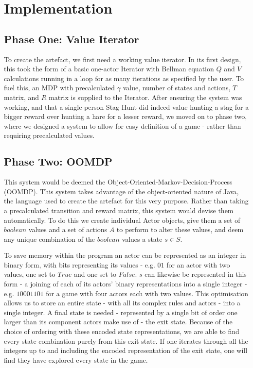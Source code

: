 \chapter{Implementation}\label{C:imp}

\section{Phase One: Value Iterator}

To create the artefact, we first need a working value iterator. In its first design, this took the form of a basic one-actor Iterator with Bellman equation $Q$ and $V$ calculations running in a loop for as many iterations as specified by the user. To fuel this, an MDP with precalculated $\gamma$ value, number of states and actions, $T$ matrix, and $R$ matrix is supplied to the Iterator. After ensuring the system was working, and that a single-person Stag Hunt did indeed value hunting a stag for a bigger reward over hunting a hare for a lesser reward, we moved on to phase two, where we designed a system to allow for easy definition of a game - rather than requiring precalculated values.

\section{Phase Two: OOMDP}

This system would be deemed the Object-Oriented-Markov-Decision-Process (OOMDP). This system takes advantage of the object-oriented nature of Java, the language used to create the artefact for this very purpose. Rather than taking a precalculated transition and reward matrix, this system would devise them automatically. To do this we create individual Actor objects, give them a set of $boolean$ values and a set of actions $A$ to perform to alter these values, and deem any unique combination of the $boolean$ values a state $s \in S$. 

To save memory within the program an actor can be represented as an integer in binary form, with bits representing its values - e.g. $01$ for an actor with two values, one set to $True$ and one set to $False$. $s$ can likewise be represented in this form - a joining of each of its actors' binary representations into a single integer - e.g. $10001101$ for a game with four actors each with two values. This optimisation allows us to store an entire state - with all its complex rules and actors - into a single integer. A final state is needed - represented by a single bit of order one larger than its component actors make use of - the exit state. Because of the choice of ordering with these encoded state representations, we are able to find every state combination purely from this exit state. If one iterates through all the integers up to and including the encoded representation of the exit state, one will find they have explored every state in the game.

